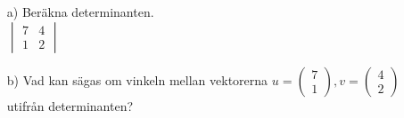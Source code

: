 \begin{itemize}
    \item[a) ]	Beräkna determinanten.
				\newline
				\\
				$ 
    			\begin{vmatrix}
   		 		7  & 4 \\
  		  		1  & 2
		    	\end{vmatrix}
  			  	$
    \item[b) ]	Vad kan sägas om vinkeln mellan vektorerna 
    			$
    			u =   			  
				\begin{pmatrix}
   		 		7  \\
  		  		1  
		    	\end{pmatrix}  		
		    	,
		    	v =   			  
				\begin{pmatrix}
   		 		4  \\
  		  		2  
		    	\end{pmatrix}  			
		    	$ 
		    	utifrån determinanten?
\end{itemize}
